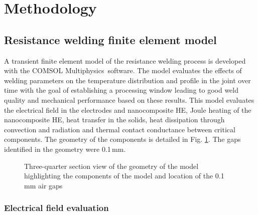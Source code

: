 \section{Methodology}

\subsection{Resistance welding finite element model}

A transient finite element model of the resistance welding process is developed with the COMSOL Multiphysics\textregistered \ software. 
The model evaluates the effects of welding parameters on the temperature distribution and profile in the joint over time with the goal of establishing a processing window leading to good weld quality and mechanical performance based on these results. 
This model evaluates the electrical field in the electrodes and nanocomposite HE, Joule heating of the nanocomposite HE, heat transfer in the solids, heat dissipation through convection and radiation and thermal contact conductance between critical components. 
The geometry of the components is detailed in Fig. \ref{fig:2_Fig2}. 
The gaps identified in the geometry were \mbox{0.1\,mm}.

\begin{figure}[h!]
	\center
	\resizebox{0.9\textwidth}{!}{
	}
	\caption{Three-quarter section view of the geometry of the model highlighting the components of the model and location of the 0.1 mm air gaps \cite{Brassard2019b}}
	\label{fig:2_Fig2}
\end{figure} 

\FloatBarrier
\subsubsection{Electrical field evaluation}


